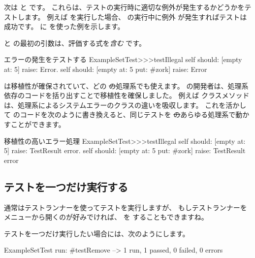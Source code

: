\documentclass[a4paper,10pt,twoside]{book}
\begin{document}
次は  と  です。
これらは、テストの実行時に適切な例外が発生するかどうかをテストします。
例えば  を実行した場合、 の実行中に例外  が発生すればテストは成功です。
 に \mbox{} を使った例を示します。

 と  の最初の引数は、評価する式を\emph{含む} です。

\begin{method}[ESTtestIllegal]{エラーの発生をテストする}
ExampleSetTest>>>testIllegal
	self should: [empty at: 5] raise: Error.
	self should: [empty at: 5 put: #zork] raise: Error
\end{method}

\sunit は移植性が確保されていて、どの \st の処理系でも使えます。
\sunit の開発者は、処理系依存のコードを括り出すことで移植性を確保しました。
例えば  クラスメソッドは、処理系によるシステムエラーのクラスの違いを吸収します。
これを活かして  のコードを次のように書き換えると、同じテストを \st のあらゆる処理系で動かすことができます。

\begin{method}[portabletestillegal]{移植性の高いエラー処理}
ExampleSetTest>>>testIllegal
	self should: [empty at: 5] raise: TestResult error.
	self should: [empty at: 5 put: #zork] raise: TestResult error
\end{method}


\subsection{テストを一つだけ実行する}
通常はテストランナーを使ってテストを実行しますが、
もしテストランナーを  メニューから開くのが好みでければ、 を  することもできますね。

テストを一つだけ実行したい場合には、次のようにします。

\begin{code}{}
ExampleSetTest run: #testRemove --> 1 run, 1 passed, 0 failed, 0 errors
\end{code}

\end{document}
